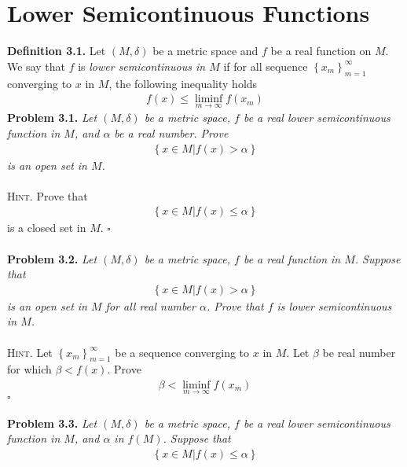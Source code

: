 \documentclass[a4paper]{article}
\numberwithin{equation}{section}
\begin{document}
\section{Lower Semicontinuous Functions}
\textbf{Definition 3.1.} Let $\left( {M,\delta } \right)$ be a metric space and $f$ be a real function on $M$. We say that $f$ is \textit{lower semicontinuous in $M$} if for all sequence $\left\{ {{x_m}} \right\}_{m = 1}^\infty $ converging to $x$ in $M$, the following inequality holds
\begin{align}
f\left( x \right) \le \mathop {\lim \inf }\limits_{m \to \infty } f\left( {{x_m}} \right)
\end{align}
\textbf{Problem 3.1.} \textit{Let $\left( {M,\delta } \right)$ be a metric space, $f$ be a real lower semicontinuous function in $M$, and $\alpha$ be a real number. Prove}
\begin{align}
\left\{ {x \in M|f\left( x \right) > \alpha } \right\}
\end{align}
\textit{is an open set in $M$.}\\
\\
\textsc{Hint.} Prove that 
\begin{align}
\left\{ {x \in M|f\left( x \right) \le \alpha } \right\}
\end{align}
is a closed set in $M$. \hfill $\square$\\
\\
\textbf{Problem 3.2.} \textit{Let $\left( {M,\delta } \right)$ be a metric space, $f$ be a real function in $M$. Suppose that}
\begin{align}
\left\{ {x \in M|f\left( x \right) > \alpha } \right\}
\end{align}
\textit{is an open set in $M$ for all real number $\alpha$. Prove that $f$ is lower semicontinuous in $M$.}\\
\\
\textsc{Hint.} Let $\left\{ {{x_m}} \right\}_{m = 1}^\infty $ be a sequence converging to $x$ in $M$. Let $\beta$ be real number for which $\beta <f\left(x\right)$. Prove
\begin{align}
\beta  < \mathop {\lim \inf }\limits_{m \to \infty } f\left( {{x_m}} \right)
\end{align}
\hfill $\square$\\
\\
\textbf{Problem 3.3.} \textit{Let $\left( {M,\delta } \right)$ be a metric space, $f$ be a real lower semicontinuous function in $M$, and $\alpha$ in $f\left(M\right)$. Suppose that}
\begin{align}
\left\{ {x \in M|f\left( x \right) \le \alpha } \right\}
\end{align}
\end{document}
